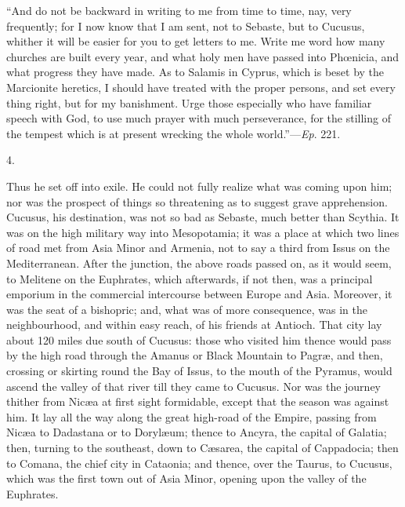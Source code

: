 ``And do not be backward in writing to me from time to time,
nay, very frequently; for I now know that I am sent, not to Sebaste,
but to Cucusus, whither it will be easier for you to get letters to
me. Write me word how many churches are built every year, and what
holy men have passed into Phœnicia, and what progress they have made.
As to Salamis in Cyprus, which is beset by the Marcionite heretics, I
should have treated with the proper persons, and set every thing
right, but for my banishment. Urge those especially who have familiar
speech with God, to use much prayer with much perseverance, for the
stilling of the tempest which is at present wrecking the whole
world.''—\emph{Ep}. 221.

4.

Thus he set off into exile. He could not fully realize what was
coming upon him; nor was the prospect of things so threatening as to
suggest grave apprehension. Cucusus, his destination, was not so bad
as Sebaste, much better than Scythia. It was on the high military way
into Mesopotamia; it was a place at which two lines of road met from
Asia Minor and Armenia, not to say a third from Issus on the
Mediterranean. After the junction, the above roads passed on, as it
would seem, to Melitene on the Euphrates, which afterwards, if not
then, was a principal emporium in the commercial intercourse between
Europe and Asia. Moreover, it was the seat of a bishopric; and, what
was of more consequence, was in the neighbourhood, and within
easy reach, of his friends at Antioch. That city lay about 120 miles
due south of Cucusus: those who visited him thence would pass by the
high road through the Amanus or Black Mountain to Pagræ, and then,
crossing or skirting round the Bay of Issus, to the mouth of the
Pyramus, would ascend the valley of that river till they came to
Cucusus. Nor was the journey thither from Nicæa at first sight
formidable, except that the season was against him. It lay all the way
along the great high-road of the Empire, passing from Nicæa to
Dadastana or to Dorylæum; thence to Ancyra, the capital of Galatia;
then, turning to the southeast, down to Cæsarea, the capital of
Cappadocia; then to Comana, the chief city in Cataonia; and thence,
over the Taurus, to Cucusus, which was the first town out of Asia
Minor, opening upon the valley of the Euphrates.

